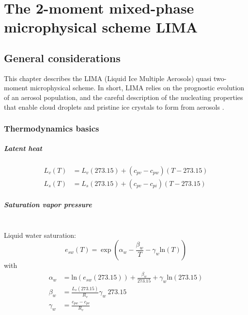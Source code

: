 \chapter{The 2-moment mixed-phase microphysical scheme LIMA}
\minitoc


\section{General considerations}
This chapter describes the LIMA (Liquid Ice Multiple Aerosols) quasi two-moment microphysical scheme.
In short, LIMA relies on the prognostic evolution of an aerosol population, and the careful description of the nucleating properties that enable cloud droplets and pristine ice crystals to form from aerosols \citep{Vie2016}. 

\subsection{Thermodynamics basics}

\paragraph{Latent heat}
\begin{align}
 \label{latent-heat-vaporization}
 L_v(T) &= L_v(273.15) + (c_{pv} - c_{pw}) (T-273.15) \\
 \label{latent-heat-sublimation}
 L_s(T) &= L_s(273.15) + (c_{pv} - c_{pi}) (T-273.15)
\end{align}

\paragraph{Saturation vapor pressure}
~\\
Liquid water saturation:
\begin{equation}
 \label{saturation-pressure-water}
 e_{sw}(T) = \exp(\alpha_w - \frac{\beta_w}{T} - \gamma_w\mathrm{ln}(T))
\end{equation}
with
\begin{align}
 \alpha_w &= \mathrm{ln}(e_{sw}(273.15)) + \frac{\beta_w}{273.15} + \gamma_w\mathrm{ln}(273.15) \\
 \beta_w &= \frac{L_v(273.15)}{R_v} \gamma_w ~ 273.15 \\
 \gamma_w &= \frac{c_{pw} - c_{pv}}{R_v}
\end{align}

